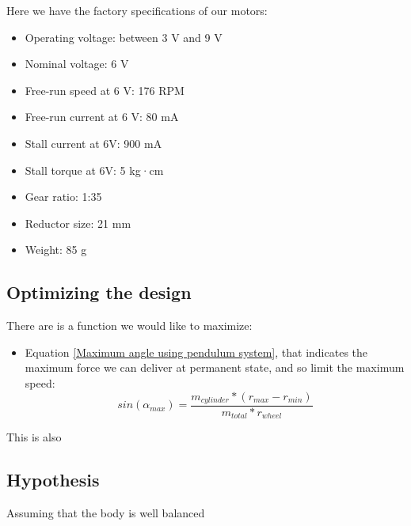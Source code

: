 Here we have the factory specifications of our motors: 
\begin{itemize}
    \item Operating voltage: between 3 V and 9 V
    \item Nominal voltage: 6 V
    \item Free-run speed at 6 V: 176 RPM
    \item Free-run current at 6 V: 80 mA
    \item Stall current at 6V: 900 mA
    \item Stall torque at 6V: 5 kg·cm
    \item Gear ratio: 1:35
    \item Reductor size: 21 mm
    \item Weight: 85 g
\end{itemize}

\subsection{Optimizing the design}
There are is a function we would like to maximize:
\begin{itemize}
    \item Equation \ref{Maximum angle using pendulum system}, that indicates the maximum force we can deliver at permanent state, and so limit the maximum speed:
     \[sin(\alpha_{max}) = \frac{m_{cylinder} * (r_{max}- r_{min})}{m_{total} * r_{wheel}}\]
\end{itemize}

This is also 





\subsection{Hypothesis}
Assuming that the body is well balanced
